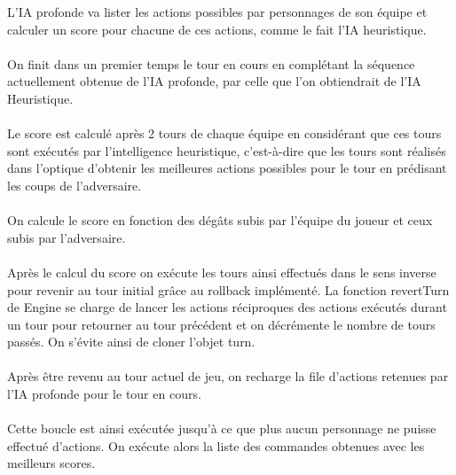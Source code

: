 L'IA profonde va lister les actions possibles par personnages 
de son équipe et calculer un score pour chacune de ces actions, comme le
fait l'IA heuristique. 
\\\\
On finit dans un premier temps le tour en cours en complétant la séquence
actuellement obtenue de l'IA profonde, par celle que l'on obtiendrait de
l'IA Heuristique.
\\\\
Le score est calculé après 2 tours de chaque équipe en considérant que
ces tours sont exécutés par l'intelligence heuristique, c'est-à-dire que
les tours sont réalisés dans l'optique d'obtenir les meilleures actions
possibles pour le tour en prédisant les coups de l'adversaire.
\\\\
On calcule le score en fonction des dégâts subis par l'équipe du joueur
et ceux subis par l'adversaire.
\\\\
Après le calcul du score on exécute les tours ainsi effectués dans le
sens inverse pour revenir au tour initial grâce au rollback implémenté.
La fonction revertTurn de Engine se charge de lancer les actions réciproques 
des actions exécutés durant un tour pour retourner au tour précédent et on 
décrémente le nombre de tours passés.
On s'évite ainsi de cloner l'objet turn.
\\\\
Après être revenu au tour actuel de jeu, on recharge la file d'actions retenues 
par l'IA profonde pour le tour en cours.
\\\\
Cette boucle est ainsi exécutée jusqu'à ce que plus aucun personnage ne 
puisse effectué d'actions. On exécute alors la liste des commandes
obtenues avec les meilleurs scores.

